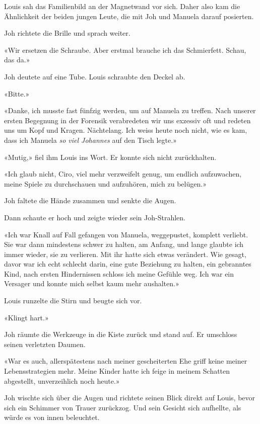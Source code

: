 Louis sah das Familienbild an der Magnetwand vor sich. Daher also kam
die Ähnlichkeit der beiden jungen Leute, die mit Joh und Manuela darauf
posierten.

Joh richtete die Brille und sprach weiter.

«Wir ersetzen die Schraube. Aber erstmal brauche ich das Schmierfett.
Schau, das da.»

Joh deutete auf eine Tube. Louis schraubte den Deckel ab.

«Bitte.»

«Danke, ich musste fast fünfzig werden, um auf Manuela zu treffen. Nach
unserer ersten Begegnung in der Forensik verabredeten wir uns exzessiv
oft und redeten uns um Kopf und Kragen. Nächtelang. Ich weiss heute noch
nicht, wie es kam, dass ich Manuela \emph{so viel Johannes} auf den
Tisch legte.»

«Mutig,» fiel ihm Louis ins Wort. Er konnte sich nicht zurückhalten.

«Ich glaub nicht, Ciro, viel mehr verzweifelt genug, um endlich
aufzuwachen, meine Spiele zu durchschauen und aufzuhören, mich zu
belügen.»

Joh faltete die Hände zusammen und senkte die Augen.

Dann schaute er hoch und zeigte wieder sein Joh-Strahlen.

«Ich war Knall auf Fall gefangen von Manuela, weggepustet, komplett
verliebt. Sie war dann mindestens schwer zu halten, am Anfang, und lange
glaubte ich immer wieder, sie zu verlieren. Mit ihr hatte sich etwas
verändert. Wie gesagt, davor war ich echt schlecht darin, eine gute
Beziehung zu halten, ein gebranntes Kind, nach ersten Hindernissen
schloss ich meine Gefühle weg. Ich war ein Versager und konnte mich
selbst kaum mehr aushalten.»

Louis runzelte die Stirn und beugte sich vor.

«Klingt hart.»

Joh räumte die Werkzeuge in die Kiste zurück und stand auf. Er umschloss
seinen verletzten Daumen.

«War es auch, allerspätestens nach meiner gescheiterten Ehe griff keine
meiner Lebensstrategien mehr. Meine Kinder hatte ich feige in meinem
Schatten abgestellt, unverzeihlich noch heute.»

Joh wischte sich über die Augen und richtete seinen Blick direkt auf
Louis, bevor sich ein Schimmer von Trauer zurückzog. Und sein Gesicht
sich aufhellte, als würde es von innen beleuchtet.

